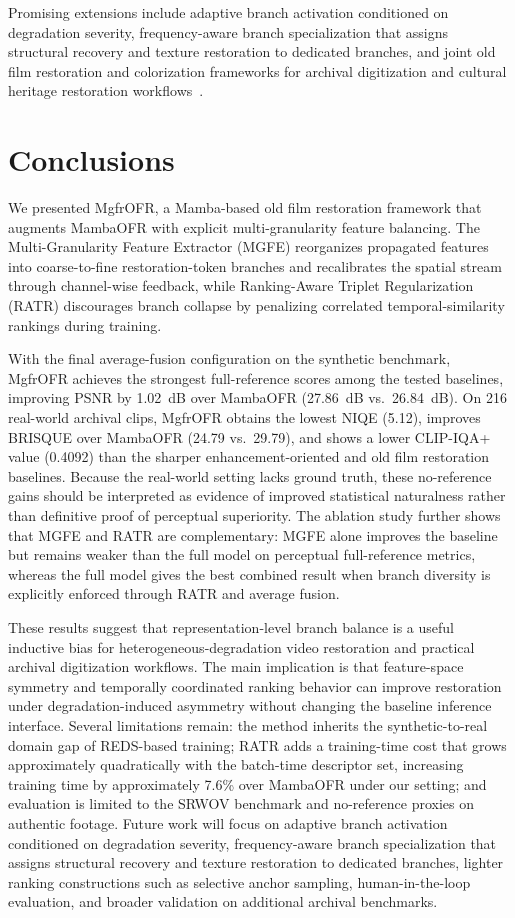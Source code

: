 \documentclass[symmetry,article,submit,pdftex,moreauthors]{Definitions/mdpi}
\begin{document}
Promising extensions include adaptive branch activation conditioned on degradation severity, frequency-aware branch specialization that assigns structural recovery and texture restoration to dedicated branches, and joint old film restoration and colorization frameworks for archival digitization and cultural heritage restoration workflows~\cite{kokaram2004missing}.
\section{Conclusions}
\label{sec:conclusion}

We presented MgfrOFR, a Mamba-based old film restoration framework that augments MambaOFR with explicit multi-granularity feature balancing. The Multi-Granularity Feature Extractor (MGFE) reorganizes propagated features into coarse-to-fine restoration-token branches and recalibrates the spatial stream through channel-wise feedback, while Ranking-Aware Triplet Regularization (RATR) discourages branch collapse by penalizing correlated temporal-similarity rankings during training.

With the final average-fusion configuration on the synthetic benchmark, MgfrOFR achieves the strongest full-reference scores among the tested baselines, improving PSNR by 1.02~dB over MambaOFR (27.86~dB vs.\ 26.84~dB). On 216 real-world archival clips, MgfrOFR obtains the lowest NIQE (5.12), improves BRISQUE over MambaOFR (24.79 vs.\ 29.79), and shows a lower CLIP-IQA+ value (0.4092) than the sharper enhancement-oriented and old film restoration baselines. Because the real-world setting lacks ground truth, these no-reference gains should be interpreted as evidence of improved statistical naturalness rather than definitive proof of perceptual superiority. The ablation study further shows that MGFE and RATR are complementary: MGFE alone improves the baseline but remains weaker than the full model on perceptual full-reference metrics, whereas the full model gives the best combined result when branch diversity is explicitly enforced through RATR and average fusion.

These results suggest that representation-level branch balance is a useful inductive bias for heterogeneous-degradation video restoration and practical archival digitization workflows. The main implication is that feature-space symmetry and temporally coordinated ranking behavior can improve restoration under degradation-induced asymmetry without changing the baseline inference interface. Several limitations remain: the method inherits the synthetic-to-real domain gap of REDS-based training; RATR adds a training-time cost that grows approximately quadratically with the batch-time descriptor set, increasing training time by approximately 7.6\% over MambaOFR under our setting; and evaluation is limited to the SRWOV benchmark and no-reference proxies on authentic footage. Future work will focus on adaptive branch activation conditioned on degradation severity, frequency-aware branch specialization that assigns structural recovery and texture restoration to dedicated branches, lighter ranking constructions such as selective anchor sampling, human-in-the-loop evaluation, and broader validation on additional archival benchmarks.
 
\end{document}
